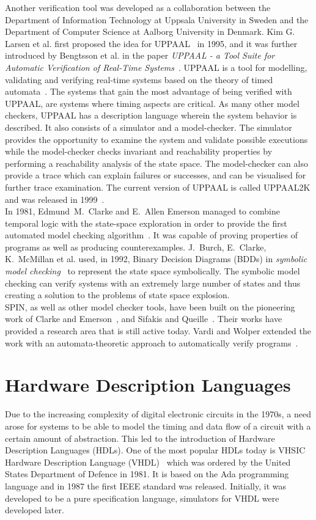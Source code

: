 Another verification tool was developed as a collaboration between the Department of Information Technology at Uppsala University in Sweden and the Department of Computer Science at Aalborg University in Denmark. Kim G. Larsen et al. first proposed the idea for UPPAAL~\cite{Larsen1995} in 1995, and it was further introduced by Bengtsson et al. in the paper \textit{UPPAAL - a Tool Suite for Automatic Verification of Real-Time Systems}~\cite{Bengtsson1995}.
UPPAAL is a tool for modelling, validating and verifying real-time systems based on the theory of timed automata~\cite{Alur1990}.
The systems that gain the most advantage of being verified with UPPAAL, are systems where timing aspects are critical.
As many other model checkers, UPPAAL has a description language wherein the system behavior is described. It also consists of a simulator and a model-checker. The simulator provides the opportunity to examine the system and validate possible executions while the model-checker checks invariant and reachability properties by performing a reachability analysis of the state space. The model-checker can also provide a trace which can explain failures or successes, and can be visualised for further trace examination.
The current version of UPPAAL is called UPPAAL2K and was released in 1999~\cite{Amnell2001}.\\

In 1981, Edmund~M.~Clarke and E.~Allen Emerson managed to combine temporal logic with the state-space exploration in order to provide the first automated model checking algorithm~\cite{Clarke1981}. It was capable of proving properties of programs as well as producing counterexamples.
J.~Burch, E.~Clarke, K.~McMillan et al. used, in 1992, Binary Decision Diagrams (BDDs) in \textit{symbolic model checking}~\cite{Burch1992} to represent the state space symbolically. The symbolic model checking can verify systems with an extremely large number of states and thus creating a solution to the problems of state space explosion.\\

SPIN, as well as other model checker tools, have been built on the pioneering work of Clarke and Emerson~\cite{Clarke1981}, and Sifakis and Queille~\cite{Queille1982}. Their works have provided a research area that is still active today. Vardi and Wolper extended the work with an automata-theoretic approach to automatically verify programs~\cite{Vardi1986}.
\section{Hardware Description Languages}
Due to the increasing complexity of digital electronic circuits in the 1970s, a need arose for systems to be able to model the timing and data flow of a circuit with a certain amount of abstraction. This led to the introduction of Hardware Description Languages (HDLs). One of the most popular HDLs today is VHSIC Hardware Description Language (VHDL)~\cite{VHDL} which was ordered by the United States Department of Defence in 1981. It is based on the Ada programming language and in 1987 the first IEEE standard was released. Initially, it was developed to be a pure specification language, simulators for VHDL were developed later.\\


